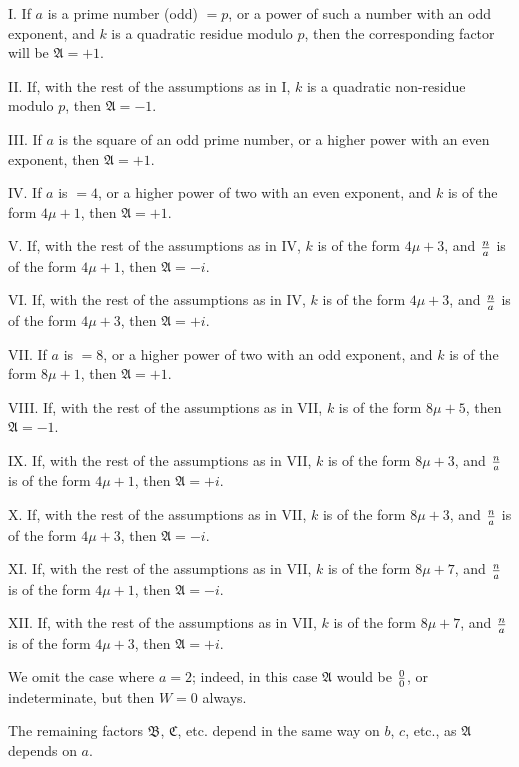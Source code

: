 \documentclass[twoside,12pt]{memoir}
\let\oldfrac\frac
\def\frac#1#2{\mathchoice{\tfrac{#1}{#2}}{\oldfrac{#1}{#2}}{\genfrac{}{}{}{2}{#1}{#2\mathstrut}}{\genfrac{}{}{}{3}{#1}{#2\mathstrut}}}
\begin{document}
I. If \(a\) is a prime number (odd) \(=p\), or a power of such a number with an odd exponent, and \(k\) is a quadratic residue modulo \(p\), then the corresponding factor will be \(\mathfrak{A}=+1\).
 
II. If, with the rest of the assumptions as in I, \(k\) is a quadratic non-residue modulo \(p\), then \(\mathfrak{A}=-1\).
 
III. If \(a\) is the square of an odd prime number, or a higher power with an even exponent, then \(\mathfrak{A}=+1\).
%

IV. If \(a\) is \(=4\), or a higher power of two with an even exponent, and \(k\) is of the form \(4 \mu+1\), then \(\mathfrak{A}=+1\).
 
V. If, with the rest of the assumptions as in IV, \(k\) is of the form \(4 \mu+3\), and \(\frac{n}{a}\) is of the form \(4 \mu+1\), then \(\mathfrak{A}=-i\).
 
VI. If, with the rest of the assumptions as in IV, \(k\) is of the form \(4 \mu+3\), and \(\frac{n}{a}\) is of the form \(4 \mu+3\), then \(\mathfrak{A}=+i\).
 
VII. If \(a\) is \(=8\), or a higher power of two with an odd exponent, and \(k\) is of the form \(8 \mu+1\), then \(\mathfrak{A}=+1\).
 
VIII. If, with the rest of the assumptions as in VII, \(k\) is of the form \(8 \mu+5\), then \(\mathfrak{A}=-1\).
 
IX. If, with the rest of the assumptions as in VII, \(k\) is of the form \(8 \mu+3\), and \(\frac{n}{a}\) is of the form \(4 \mu+1\), then \(\mathfrak{A}=+i\).
 
X. If, with the rest of the assumptions as in VII, \(k\) is of the form \(8 \mu+3\), and \(\frac{n}{a}\) is of the form \(4 \mu+3\), then \(\mathfrak{A}=-i\).
 
XI. If, with the rest of the assumptions as in VII, \(k\) is of the form \(8 \mu+7\), and \(\frac{n}{a}\) is of the form \(4 \mu+1\), then \(\mathfrak{A}=-i\).
 
XII. If, with the rest of the assumptions as in VII, \(k\) is of the form \(8 \mu+7\), and \(\frac{n}{a}\) is of the form \(4 \mu+3\), then \(\mathfrak{A}=+i\).
 
We omit the case where \(a=2\); indeed, in this case \(\mathfrak{A}\) would be \(\frac{0}{0}\), or indeterminate, but then \(W=0\) always.
 
The remaining factors \(\mathfrak{B}\), \(\mathfrak{C}\), etc{.} depend in the same way on \(b\), \(c\), etc{.}, as \(\mathfrak{A}\) depends on \(a\).
%
\end{document}

